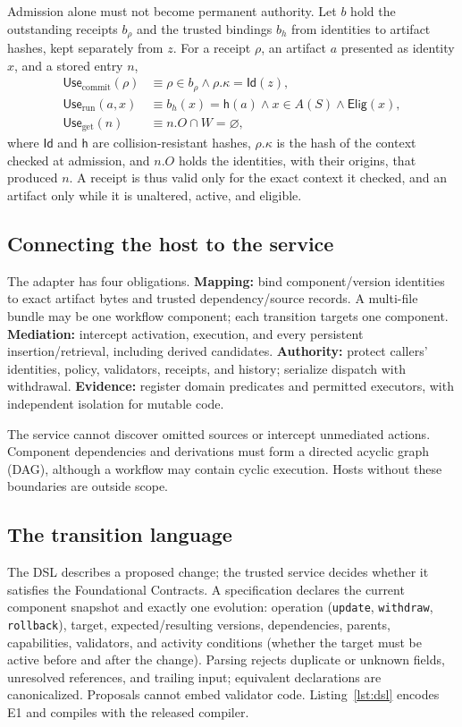 \documentclass[letterpaper,journal]{IEEEtran}
\begin{document}
Admission alone must not become permanent authority. Let $b$ hold the outstanding receipts $b_\rho$ and the trusted bindings $b_h$ from identities to artifact hashes, kept separately from $z$. For a receipt $\rho$, an artifact $a$ presented as identity $x$, and a stored entry $n$,
\begin{equation}
\begin{aligned}
\mathsf{Use}_{\mathrm{commit}}(\rho)&\equiv\rho\in b_\rho\wedge\rho.\kappa=\mathsf{Id}(z),\\
\mathsf{Use}_{\mathrm{run}}(a,x)&\equiv b_h(x)=\mathsf{h}(a)\wedge x\in A(S)\wedge\mathsf{Elig}(x),\\
\mathsf{Use}_{\mathrm{get}}(n)&\equiv n.O\cap W=\varnothing,
\end{aligned}
\label{eq:use}
\end{equation}
where $\mathsf{Id}$ and $\mathsf{h}$ are collision-resistant hashes, $\rho.\kappa$ is the hash of the context checked at admission, and $n.O$ holds the identities, with their origins, that produced $n$. A receipt is thus valid only for the exact context it checked, and an artifact only while it is unaltered, active, and eligible.

\subsection{Connecting the host to the service}\label{sec:adapter}
The adapter has four obligations. \textbf{Mapping:} bind component/version identities to exact artifact bytes and trusted dependency/source records. A multi-file bundle may be one workflow component; each transition targets one component. \textbf{Mediation:} intercept activation, execution, and every persistent insertion/retrieval, including derived candidates. \textbf{Authority:} protect callers' identities, policy, validators, receipts, and history; serialize dispatch with withdrawal. \textbf{Evidence:} register domain predicates and permitted executors, with independent isolation for mutable code.

The service cannot discover omitted sources or intercept unmediated actions. Component dependencies and derivations must form a directed acyclic graph (DAG), although a workflow may contain cyclic execution. Hosts without these boundaries are outside scope.

\subsection{The transition language}\label{sec:dsl}
The DSL describes a proposed change; the trusted service decides whether it satisfies the Foundational Contracts. A specification declares the current component snapshot and exactly one evolution: operation (\texttt{update}, \texttt{withdraw}, \texttt{rollback}), target, expected/resulting versions, dependencies, parents, capabilities, validators, and activity conditions (whether the target must be active before and after the change). Parsing rejects duplicate or unknown fields, unresolved references, and trailing input; equivalent declarations are canonicalized. Proposals cannot embed validator code. Listing~\ref{lst:dsl} encodes E1 and compiles with the released compiler.
\end{document}
